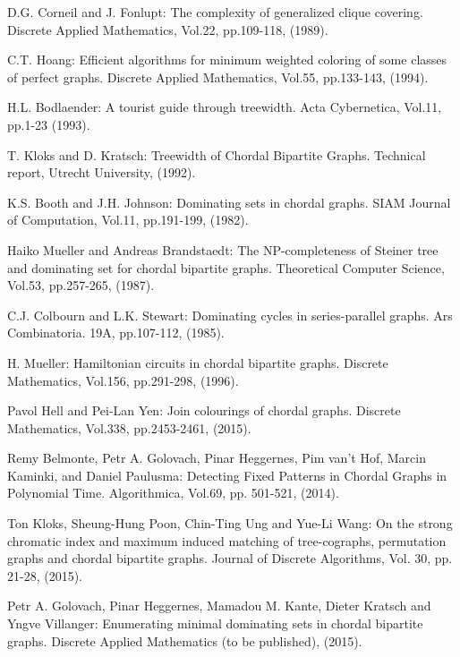 \documentclass[runningheads]{llncs}
\begin{document}
\begin{thebibliography}{}
D.G. Corneil and J. Fonlupt: The complexity of generalized clique covering. Discrete Applied Mathematics, Vol.22, pp.109-118, (1989). 

C.T. Hoang: Efficient algorithms for minimum weighted coloring of some classes of perfect graphs. Discrete Applied Mathematics, Vol.55, pp.133-143, (1994).





H.L. Bodlaender: A tourist guide through treewidth. Acta Cybernetica, Vol.11, pp.1-23 (1993).

T. Kloks and D. Kratsch: Treewidth of Chordal Bipartite Graphs. Technical report, Utrecht University, (1992).







K.S. Booth and J.H. Johnson: Dominating sets in chordal graphs. SIAM Journal of Computation, Vol.11, pp.191-199, (1982).

Haiko Mueller and Andreas Brandstaedt: The NP-completeness of Steiner tree and dominating set for chordal bipartite graphs. Theoretical Computer Science, Vol.53, pp.257-265, (1987).

C.J. Colbourn and L.K. Stewart: Dominating cycles in series-parallel graphs. Ars Combinatoria. 19A, pp.107-112, (1985).


H. Mueller: Hamiltonian circuits in chordal bipartite graphs. Discrete Mathematics, Vol.156, pp.291-298, (1996).

Pavol Hell and Pei-Lan Yen: Join colourings of chordal graphs. Discrete Mathematics, Vol.338, pp.2453-2461, (2015).


Remy Belmonte, Petr A. Golovach, Pinar Heggernes, Pim van't Hof, Marcin Kaminki, and Daniel Paulusma: Detecting Fixed Patterns in Chordal Graphs
in Polynomial Time. Algorithmica, Vol.69, pp. 501-521, (2014).

Ton Kloks, Sheung-Hung Poon, Chin-Ting Ung and  Yue-Li Wang: On the strong chromatic index and maximum induced matching of tree-cographs, permutation graphs and chordal bipartite graphs. Journal of Discrete Algorithms, Vol. 30, pp. 21-28, (2015). 

Petr A. Golovach, Pinar Heggernes, Mamadou M. Kante, Dieter Kratsch and Yngve Villanger: Enumerating minimal dominating sets in chordal bipartite graphs. Discrete Applied Mathematics (to be published), (2015).


\end{thebibliography}
\end{document}
